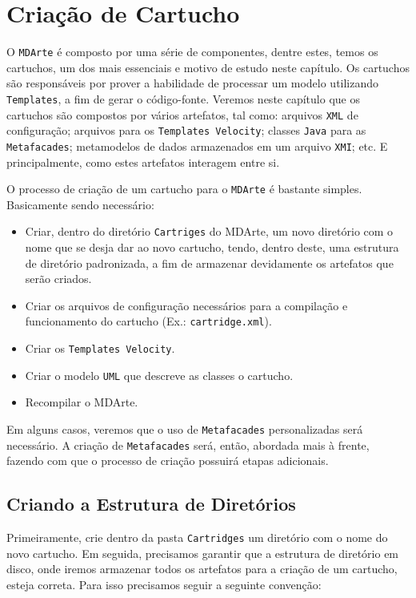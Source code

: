 \chapter{Criação de Cartucho}

O \texttt{MDArte} é composto por uma série de componentes, dentre estes, temos
os cartuchos, um dos mais essenciais e motivo de estudo neste capítulo. Os
cartuchos são responsáveis por prover a habilidade de processar um modelo
utilizando \texttt{Templates}, a fim de gerar o código-fonte. Veremos neste
capítulo que os cartuchos são compostos por vários artefatos, tal como: arquivos
\texttt{XML} de configuração; arquivos para os \texttt{Templates Velocity};
classes \texttt{Java} para as \texttt{Metafacades}; metamodelos de dados
armazenados em um arquivo \texttt{XMI}; etc. E principalmente, como estes
artefatos interagem entre si.

O processo de criação de um cartucho para o \texttt{MDArte} é bastante simples.
Basicamente sendo necessário:
\begin{itemize}
\item Criar, dentro do diretório \texttt{Cartriges} do MDArte, um novo diretório
com o nome que se desja dar ao novo cartucho, tendo, dentro deste, uma estrutura
de diretório padronizada, a fim de armazenar devidamente os artefatos que serão
criados.
\item Criar os arquivos de configuração necessários para a compilação e
funcionamento do cartucho (Ex.: \texttt{cartridge.xml}).
\item Criar os \texttt{Templates Velocity}.
\item Criar o modelo \texttt{UML} que descreve as classes o
cartucho.
\item Recompilar o MDArte.
\end{itemize}

Em alguns casos, veremos que o uso de \texttt{Metafacades} personalizadas será
necessário. A criação de \texttt{Metafacades} será, então, abordada mais à
frente, fazendo com que o processo de criação possuirá etapas adicionais.

\section{Criando a Estrutura de Diretórios}
Primeiramente, crie dentro da pasta \texttt{Cartridges} um diretório com o nome
do novo cartucho. Em seguida, precisamos garantir que a estrutura
de diretório em disco, onde iremos armazenar todos os artefatos para a criação
de um cartucho, esteja correta. Para isso precisamos seguir a seguinte
convenção:


